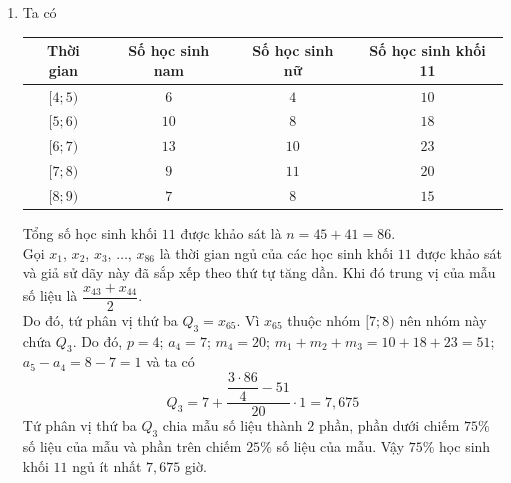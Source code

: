 \begin{ex}
{\begin{enumerate}
			Tổng số các bạn  nữ là $n_2=4+8+10+11+8=41$.\\
			Thời gian ngủ trung bình của các bạn học sinh  nữ là \[\overline{x}_2=\dfrac{4\cdot4,5+8\cdot5,5+10\cdot6,5+11\cdot7,5+8\cdot8,5}{41} \approx 6{,}77.\]
			Vì $6{,}52 < 6{,}77$ nên thời gian ngủ trung bình của các học  sinh nam ít hơn các học sinh nữ.
			\item  Ta có
			\begin{center}
				\begin{tabular}{|c|c|c|c|}
					 \hline
					Thời gian & Số học sinh nam & Số học sinh nữ & Số học sinh khối  11 \\
					\hline 
					$[4;5)$ & $6$ & $4$ & $10$ \\ 
					\hline 
					$[5;6)$ & $10$ & $8$ &  $18$ \\
					\hline 
					$[6;7)$  & $13$ & $10$ & $23$ \\
					\hline 
					$[7;8)$ &  $9$ & $11$ & $20$ \\
					 \hline
					$[8;9)$ & $7$ & $8$  & $15$ \\
					\hline 
				\end{tabular}
			\end{center}
			Tổng số học sinh khối $11$ được khảo sát  là $n=45+41=86$.\\
			Gọi $x_1$, $x_2$, $x_3$, $\ldots$, $x_{86}$ là thời gian ngủ của các học sinh khối  $11$ được khảo sát và giả sử dãy này đã sắp xếp theo thứ tự tăng dần. Khi đó trung vị của mẫu số liệu là $\dfrac{x_{43}+x_{44}}{2}$.\\
			Do đó, tứ phân vị thứ ba $Q_3=x_{65}$. Vì $x_{65}$ thuộc nhóm  $[7;8)$ nên nhóm này chứa $Q_3$. Do đó, $p=4$; $a_4=7$; $m_4=20$; $m_1+m_2+m_3=10+18+23=51$; $a_5-a_4=8-7=1$ và ta có
			\[Q_3=7+\dfrac{\dfrac{3\cdot86}{4}-51}{20}\cdot1=7{,}675 
			 \]
			Tứ phân vị thứ ba $Q_3$ chia mẫu số liệu thành $2$ phần, phần dưới chiếm $75\%$ số liệu  của mẫu và phần trên chiếm $25\%$ số liệu của mẫu.
			Vậy  $75\%$ học sinh khối $11$ ngủ ít nhất $7{,}675$ giờ.
		\end{enumerate}
	} 
\end{ex}

